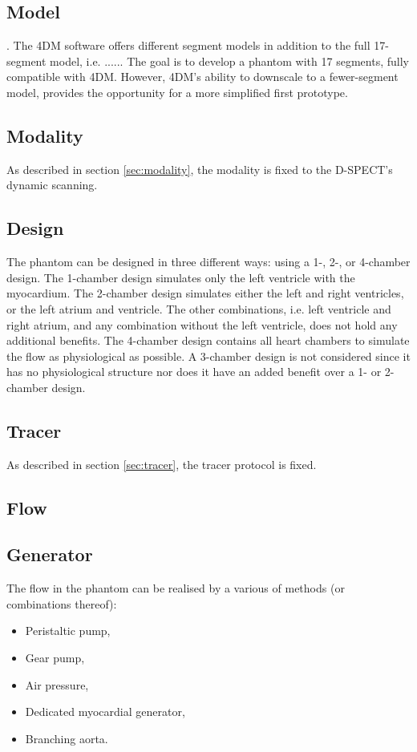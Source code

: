 \subsection*{Model}
.
The 4DM software offers different segment models in addition to the full 17-segment model, i.e. ...... The goal is to develop a phantom with 17 segments, fully compatible with 4DM. However, 4DM's ability to downscale to a fewer-segment model, provides the opportunity for a more simplified first prototype.
\subsection{Modality}
As described in section \ref{sec:modality}, the modality is fixed to the D-SPECT's dynamic scanning.
\subsection{Design}
The phantom can be designed in three different ways: using a 1-, 2-, or 4-chamber design. The 1-chamber design simulates only the left ventricle with the myocardium. The 2-chamber design simulates either the left and right ventricles, or the left atrium and ventricle. The other combinations, i.e. left ventricle and right atrium, and any combination without the left ventricle, does not hold any additional benefits. The 4-chamber design contains all heart chambers to simulate the flow as physiological as possible. A 3-chamber design is not considered since it has no physiological structure nor does it have an added benefit over a 1- or 2-chamber design.
\subsection{Tracer}
As described in section \ref{sec:tracer}, the tracer protocol is fixed.
\subsection{Flow}
\subsection*{Generator}
The flow in the phantom can be realised by a various of methods (or combinations thereof):
\begin{itemize} [noitemsep]
	\item Peristaltic pump,
	\item Gear pump,
	\item Air pressure,
	\item Dedicated myocardial generator,
	\item Branching aorta.
\end{itemize}
